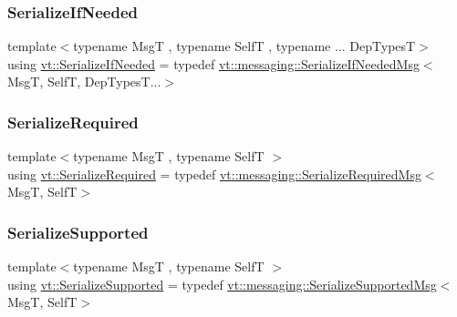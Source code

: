 \mbox{\label{namespacevt_a0a4ad8c256fcffa564e9fa7800e4b495}} 
\subsubsection{\texorpdfstring{Serialize\+If\+Needed}{SerializeIfNeeded}}
{\footnotesize\ttfamily template$<$typename MsgT , typename SelfT , typename ... Dep\+TypesT$>$ \\
using \hyperlink{namespacevt_a0a4ad8c256fcffa564e9fa7800e4b495}{vt\+::\+Serialize\+If\+Needed} = typedef \hyperlink{structvt_1_1messaging_1_1_serialize_if_needed_msg}{vt\+::messaging\+::\+Serialize\+If\+Needed\+Msg}$<$MsgT, SelfT, Dep\+Types\+T...$>$}

\mbox{\label{namespacevt_a9e60e2e8929828639383ac1d6643384d}} 
\subsubsection{\texorpdfstring{Serialize\+Required}{SerializeRequired}}
{\footnotesize\ttfamily template$<$typename MsgT , typename SelfT $>$ \\
using \hyperlink{namespacevt_a9e60e2e8929828639383ac1d6643384d}{vt\+::\+Serialize\+Required} = typedef \hyperlink{structvt_1_1messaging_1_1_serialize_required_msg}{vt\+::messaging\+::\+Serialize\+Required\+Msg}$<$MsgT, SelfT$>$}

\mbox{\label{namespacevt_a3862b8e3f67ab03f3a4313d828592fa9}} 
\subsubsection{\texorpdfstring{Serialize\+Supported}{SerializeSupported}}
{\footnotesize\ttfamily template$<$typename MsgT , typename SelfT $>$ \\
using \hyperlink{namespacevt_a3862b8e3f67ab03f3a4313d828592fa9}{vt\+::\+Serialize\+Supported} = typedef \hyperlink{structvt_1_1messaging_1_1_serialize_supported_msg}{vt\+::messaging\+::\+Serialize\+Supported\+Msg}$<$MsgT, SelfT$>$}

